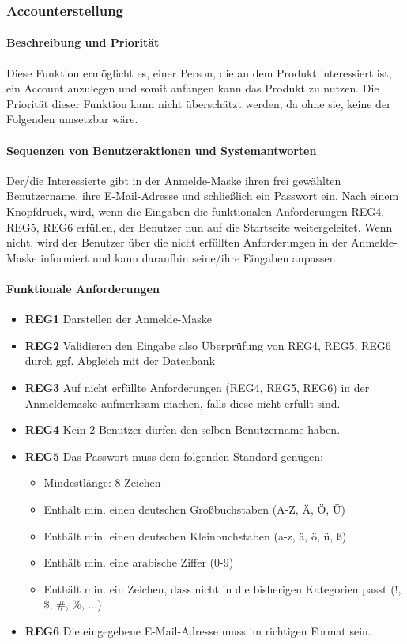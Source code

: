 \subsubsection{Accounterstellung}\label{acc}
\paragraph{Beschreibung und Priorität}
Diese Funktion ermöglicht es, einer Person, die an dem Produkt interessiert ist, ein Account anzulegen und somit anfangen kann das Produkt zu nutzen. Die Priorität dieser Funktion kann nicht überschätzt werden, da ohne sie, keine der Folgenden umsetzbar wäre.
\paragraph{Sequenzen von Benutzeraktionen und Systemantworten} Der/die Interessierte gibt in der Anmelde-Maske ihren frei gewählten Benutzername, ihre E-Mail-Adresse und schließlich ein Passwort ein. Nach einem Knopfdruck, wird, wenn die Eingaben die funktionalen Anforderungen REG4, REG5, REG6 erfüllen, der Benutzer nun auf die Startseite weitergeleitet. Wenn nicht, wird der Benutzer über die nicht erfüllten Anforderungen in der Anmelde-Maske informiert und kann daraufhin seine/ihre Eingaben anpassen.
\paragraph{Funktionale Anforderungen}
\begin{itemize}
	\item \textbf{REG1} Darstellen der Anmelde-Maske
	\item \textbf{REG2} Validieren den Eingabe also Überprüfung von REG4, REG5, REG6  durch ggf. Abgleich mit der Datenbank
	\item \textbf{REG3} Auf nicht erfüllte Anforderungen (REG4, REG5, REG6) in der Anmeldemaske aufmerksam machen, falls diese nicht erfüllt sind.
	\item \textbf{REG4} Kein 2 Benutzer dürfen den selben Benutzername haben.
	\item \textbf{REG5} Das Passwort muss dem folgenden Standard genügen:
	\begin{itemize}
		\item Mindestlänge: 8 Zeichen
		\item Enthält min. einen deutschen Großbuchstaben (A-Z, Ä, Ö, Ü)
		\item Enthält min. einen deutschen Kleinbuchstaben (a-z, ä, ö, ü, ß)
		\item Enthält min. eine arabische Ziffer (0-9)
		\item Enthält min. ein Zeichen, dass nicht in die bisherigen Kategorien passt (!, \$, \#, \%, ...)
	\end{itemize}
	\item \textbf{REG6} Die eingegebene E-Mail-Adresse muss im richtigen Format sein.
	
\end{itemize}

